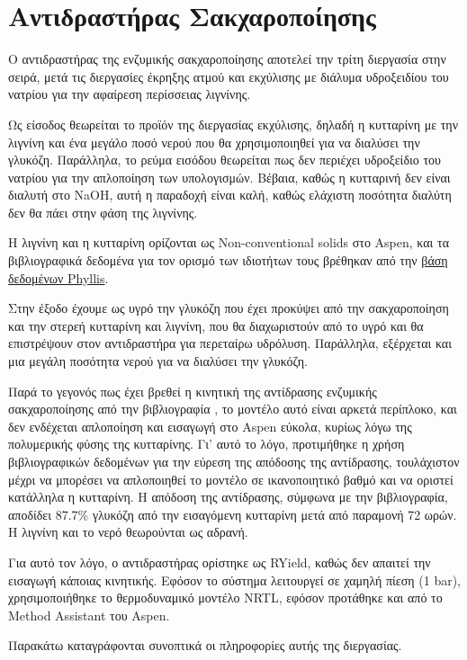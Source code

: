 \documentclass[11pt]{article}
\begin{document}
\section{Αντιδραστήρας Σακχαροποίησης}
\label{sec:org3261978}
Ο αντιδραστήρας της ενζυμικής σακχαροποίησης αποτελεί την τρίτη
διεργασία στην σειρά, μετά τις διεργασίες έκρηξης ατμού και εκχύλισης με
διάλυμα υδροξειδίου του νατρίου για την αφαίρεση περίσσειας λιγνίνης.

Ως είσοδος θεωρείται το προϊόν της διεργασίας εκχύλισης, δηλαδή η
κυτταρίνη με την λιγνίνη και ένα μεγάλο ποσό νερού που θα χρησιμοποιηθεί
για να διαλύσει την γλυκόζη. Παράλληλα, το ρεύμα εισόδου θεωρείται
πως δεν περιέχει υδροξείδιο του νατρίου για την απλοποίηση των υπολογισμών. Βέβαια, καθώς η κυτταρινή δεν είναι διαλυτή στο NaOH, αυτή η παραδοχή είναι καλή, καθώς ελάχιστη ποσότητα διαλύτη δεν θα πάει στην φάση της λιγνίνης.

Η λιγνίνη και η κυτταρίνη ορίζονται ως Non-conventional solids στο
Aspen, και τα βιβλιογραφικά δεδομένα για τον ορισμό των ιδιοτήτων τους
βρέθηκαν από την \href{https://phyllis.nl/Browse/Standard/ECN-Phyllis}{βάση δεδομένων Phyllis}.

Στην έξοδο έχουμε ως υγρό την γλυκόζη που έχει προκύψει από την
σακχαροποίηση και την στερεή κυτταρίνη και λιγνίνη, που θα διαχωριστούν
από το υγρό και θα επιστρέψουν στον αντιδραστήρα για περεταίρω υδρόλυση.
Παράλληλα, εξέρχεται και μια μεγάλη ποσότητα νερού για να διαλύσει την
γλυκόζη.

Παρά το γεγονός πως έχει βρεθεί η κινητική της αντίδρασης ενζυμικής
σακχαροποίησης από την βιβλιογραφία \cite{kadamDevelopmentValidationKinetic2004}, το μοντέλο αυτό είναι αρκετά
περίπλοκο, και δεν ενδέχεται απλοποίηση και εισαγωγή στο Aspen εύκολα,
κυρίως λόγω της πολυμερικής φύσης της κυτταρίνης. Γι' αυτό το λόγο,
προτιμήθηκε η χρήση βιβλιογραφικών δεδομένων για την εύρεση της απόδοσης
της αντίδρασης, τουλάχιστον μέχρι να μπορέσει να απλοποιηθεί το μοντέλο
σε ικανοποιητικό βαθμό και να οριστεί κατάλληλα η κυτταρίνη. Η απόδοση
της αντίδρασης, σύμφωνα με την βιβλιογραφία, αποδίδει 87.7\% γλυκόζη από
την εισαγόμενη κυτταρίνη μετά από παραμονή 72 ωρών. Η λιγνίνη και το
νερό θεωρούνται ως αδρανή.

Για αυτό τον λόγο, ο αντιδραστήρας ορίστηκε ως RYield, καθώς δεν απαιτεί
την εισαγωγή κάποιας κινητικής. Εφόσον το σύστημα λειτουργεί σε χαμηλή
πίεση (1 bar), χρησιμοποιήθηκε το θερμοδυναμικό μοντέλο NRTL, εφόσον
προτάθηκε και από το Method Assistant του Aspen.

Παρακάτω καταγράφονται συνοπτικά οι πληροφορίες αυτής της διεργασίας.
\end{document}
